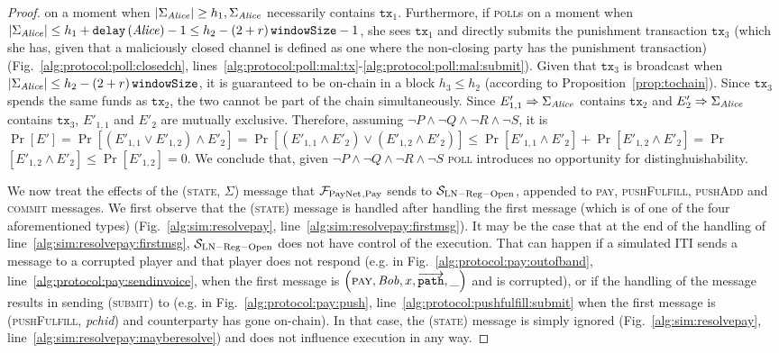 \begin{proof}
  on a moment when $|\Sigma_{\mathit{Alice}}| \geq h_1, \Sigma_{\mathit{Alice}}$ necessarily
  contains $\mathtt{tx}_1$. Furthermore, if \alice{} \textsc{poll}s on a moment
  when $|\Sigma_{\mathit{Alice}}| \leq h_1 + \mathtt{delay}\left(\mathit{Alice}\right) - 1 \leq
  h_2 - \left(2 + r\right)\texttt{windowSize}{} - 1$, she sees $\mathtt{tx}_1$ and directly submits the
  punishment transaction $\mathtt{tx}_3$ (which she has, given that a
  maliciously closed channel is defined as one where the non-closing party has
  the punishment transaction) (Fig.~\ref{alg:protocol:poll:closedch},
  lines~\ref{alg:protocol:poll:mal:tx}-\ref{alg:protocol:poll:mal:submit}).
  Given that $\mathtt{tx}_3$ is broadcast when $|\Sigma_{\mathit{Alice}}| \leq h_2 -
  \left(2 + r\right)\texttt{windowSize}{}$, it is guaranteed to be on-chain in a block $h_3 \leq h_2$
  (according to Proposition~\ref{prop:tochain}). Since $\mathtt{tx}_3$ spends
  the same funds as $\mathtt{tx}_2$, the two cannot be part of the chain
  simultaneously. Since $E'_{1,1} \Rightarrow \Sigma_{\mathit{Alice}}$ contains
  $\mathtt{tx}_2$ and $E'_2 \Rightarrow \Sigma_{\mathit{Alice}}$ contains
  $\mathtt{tx}_3$, $E'_{1,1}$ and $E'_2$ are mutually exclusive. Therefore,
  assuming $\neg P \wedge \neg Q \wedge \neg R \wedge \neg S$, it is
  $\Pr\left[E'\right] = \Pr\left[\left(E'_{1,1} \vee E'_{1,2}\right) \wedge
  E'_2\right] = \Pr\left[\left(E'_{1,1} \wedge E'_2\right) \vee \left(E'_{1,2}
  \wedge E'_2\right)\right] \leq \Pr\left[E'_{1,1} \wedge E'_2\right] +
  \Pr\left[E'_{1,2} \wedge E'_2\right] = \Pr$ $\left[ E'_{1,2} \wedge
  E'_2\right] \leq \Pr\left[E'_{1,2}\right] = 0$. We conclude that, given $\neg
  P \wedge \neg Q \wedge \neg R \wedge \neg S$ \textsc{poll} introduces no
  opportunity for distinghuishability.

  We now treat the effects of the (\textsc{state}, $\Sigma$) message that
  $\mathcal{F}_{\mathrm{PayNet}}{}_{\mathrm{, Pay}}$ sends to $\mathcal{S}_{\mathrm{LN - Reg -
  Open}}$, appended to \textsc{pay}, \textsc{pushFulfill}, \textsc{pushAdd} and
  \textsc{commit} messages. We first observe that the (\textsc{state}) message
  is handled after handling the first message (which is of one of the four
  aforementioned types) (Fig.~\ref{alg:sim:resolvepay},
  line~\ref{alg:sim:resolvepay:firstmsg}). It may be the case that at the end of
  the handling of line~\ref{alg:sim:resolvepay:firstmsg},
  $\mathcal{S}_{\mathrm{LN - Reg - Open}}$ does not have control of the
  execution. That can happen if a simulated ITI sends a message to a corrupted
  player and that player does not respond (e.g. in
  Fig.~\ref{alg:protocol:pay:outofband},
  line~\ref{alg:protocol:pay:sendinvoice}, when the first message is
  $\left(\textsc{pay}, \mathit{Bob}, x, \overrightarrow{\mathtt{path}}, \_\right)$ and
  \bob{} is corrupted), or if the handling of the message results in sending
  (\textsc{submit}) to \ledger{} (e.g. in Fig.~\ref{alg:protocol:pay:push},
  line~\ref{alg:protocol:pushfulfill:submit} when the first message is
  (\textsc{pushFulfill}, \textit{pchid}) and counterparty has gone on-chain). In
  that case, the (\textsc{state}) message is simply ignored
  (Fig.~\ref{alg:sim:resolvepay}, line~\ref{alg:sim:resolvepay:mayberesolve})
  and does not influence execution in any way.


\end{proof}
